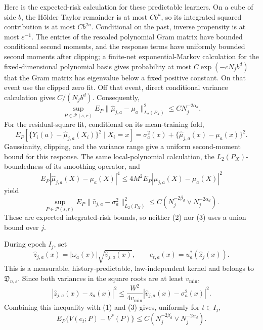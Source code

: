 Here is the expected-risk calculation for these predictable learners.  On a cube of side \(b\), the Hölder Taylor remainder is at most \(Cb^u\), so its integrated squared contribution is at most \(Cb^{2u}\).  Conditional on the past, inverse propensity is at most \(\varepsilon^{-1}\).  The entries of the rescaled polynomial Gram matrix have bounded conditional second moments, and the response terms have uniformly bounded second moments after clipping; a finite-net exponential-Markov calculation for the fixed-dimensional polynomial basis gives probability at most \(C\exp(-cN_jb^d)\) that the Gram matrix has eigenvalue below a fixed positive constant.  On that event use the clipped zero fit.  Off that event, direct conditional variance calculation gives \(C/(N_jb^d)\).  Consequently,
\[
\sup_{P\in\mathcal P(s,r)}
E_P\|\widehat\mu_{j,a}-\mu_a\|_{L_2(P_X)}^2
\leq C N_j^{-2\alpha_d}.
\tag{2}
\]
For the residual-square fit, conditional on its mean-training fold,
\[
E_P[\{Y_i(a)-\widehat\mu_{j,a}(X_i)\}^2\mid X_i=x]
=\sigma_a^2(x)+\{\widehat\mu_{j,a}(x)-\mu_a(x)\}^2.
\]
Gaussianity, clipping, and the variance range give a uniform second-moment bound for this response.  The same local-polynomial calculation, the \(L_2(P_X)\)-boundedness of its smoothing operator, and
\[
E_P|\widehat\mu_{j,a}(X)-\mu_a(X)|^4
\leq 4M^2 E_P|\widehat\mu_{j,a}(X)-\mu_a(X)|^2
\]
yield
\[
\sup_{P\in\mathcal P(s,r)}
E_P\|\widehat v_{j,a}-\sigma_a^2\|_{L_2(P_X)}^2
\leq C\left(N_j^{-2\beta_d}\vee N_j^{-2\alpha_d}\right).
\tag{3}
\]
These are expected integrated-risk bounds, so neither (2) nor (3) uses a union bound over \(j\).

During epoch \(I_j\), set
\[
\widehat z_{j,a}(x)=|\omega_a(x)|\sqrt{\widehat v_{j,a}(x)},
\qquad
e_{t,a}(x)=u_a^*(\widehat z_j(x)).
\]
This is a measurable, history-predictable, law-independent kernel and belongs to \(\mathfrak D_{n,\varepsilon}\).  Since both variances in the square roots are at least \(v_{\min}\),
\[
|\widehat z_{j,a}(x)-z_a(x)|^2
\leq \frac{W^2}{4v_{\min}}
|\widehat v_{j,a}(x)-\sigma_a^2(x)|^2.
\]
Combining this inequality with (1) and (3) gives, uniformly for \(t\in I_j\),
\[
E_P\{V(e_t;P)-V^*(P)\}
\leq C\left(N_j^{-2\beta_d}\vee N_j^{-2\alpha_d}\right).
\tag{4}
\]

